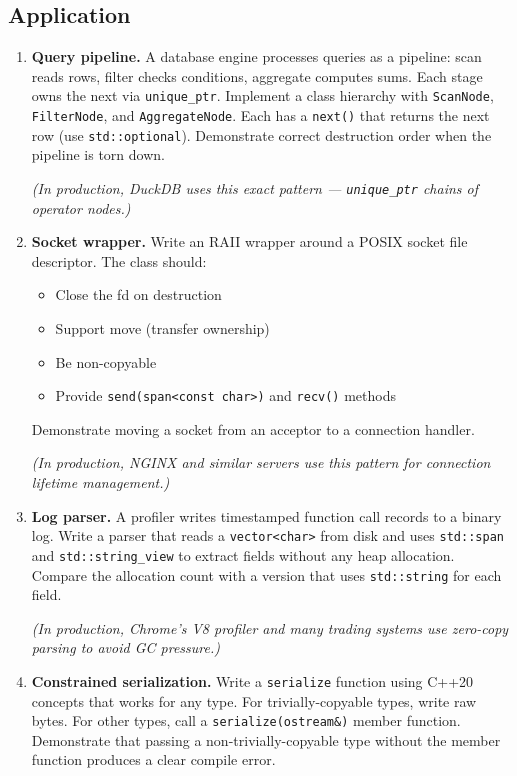\subsection{Application}

\begin{enumerate}
\item \textbf{Query pipeline.} A database engine processes queries as a pipeline: scan reads rows, filter checks conditions, aggregate computes sums. Each stage owns the next via \texttt{unique\_ptr}. Implement a class hierarchy with \texttt{ScanNode}, \texttt{FilterNode}, and \texttt{AggregateNode}. Each has a \texttt{next()} that returns the next row (use \texttt{std::optional}). Demonstrate correct destruction order when the pipeline is torn down.

   \textit{(In production, DuckDB uses this exact pattern — \texttt{unique\_ptr} chains of operator nodes.)}

\item \textbf{Socket wrapper.} Write an RAII wrapper around a POSIX socket file descriptor. The class should:
\begin{itemize}
\item Close the fd on destruction
\item Support move (transfer ownership)
\item Be non-copyable
\item Provide \texttt{send(span<const char>)} and \texttt{recv()} methods
\end{itemize}
   Demonstrate moving a socket from an acceptor to a connection handler.

   \textit{(In production, NGINX and similar servers use this pattern for connection lifetime management.)}

\item \textbf{Log parser.} A profiler writes timestamped function call records to a binary log. Write a parser that reads a \texttt{vector<char>} from disk and uses \texttt{std::span} and \texttt{std::string\_view} to extract fields without any heap allocation. Compare the allocation count with a version that uses \texttt{std::string} for each field.

   \textit{(In production, Chrome's V8 profiler and many trading systems use zero-copy parsing to avoid GC pressure.)}

\item \textbf{Constrained serialization.} Write a \texttt{serialize} function using C++20 concepts that works for any type. For trivially-copyable types, write raw bytes. For other types, call a \texttt{serialize(ostream\&)} member function. Demonstrate that passing a non-trivially-copyable type without the member function produces a clear compile error.


\end{enumerate}
